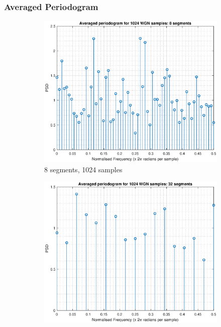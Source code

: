 \documentclass{article}
\begin{document}
\subsubsection{Averaged Periodogram}

\begin{figure}[h!]
\centering
\begin{subfigure}{0.32\textwidth}
\centering
\includegraphics[width = \textwidth]{pgm_avg_8}
\caption{8 segments, 1024 samples}
\label{fig:pgm_avg_8}
\end{subfigure}
\begin{subfigure}{0.32\textwidth}
\centering
\includegraphics[width = \textwidth]{pgm_avg_32}

\end{subfigure}
\end{figure}
\end{document}
